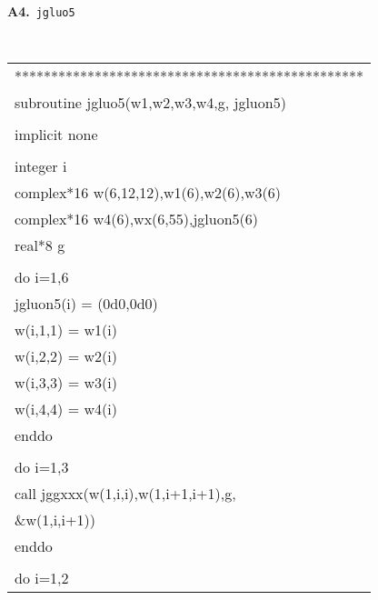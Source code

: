 \begin{center}
\clearpage
{\bf A4.}~{\tt jgluo5}\\
{\tt
\begin{supertabular}{l}
************************************************\\
     \hspace{0.5em} subroutine jgluo5(w1,w2,w3,w4,g, jgluon5) \\
\\
     \hspace{0.5em} implicit none\\
\\
     \hspace{0.5em} integer i\\
     \hspace{0.5em} complex*16 w(6,12,12),w1(6),w2(6),w3(6)\\
     \hspace{0.5em} complex*16 w4(6),wx(6,55),jgluon5(6)   \\
     \hspace{0.5em} real*8 g\\
\\
     \hspace{0.5em} do i=1,6\\
     \hspace{1em}    jgluon5(i) = (0d0,0d0)\\
     \hspace{1em}    w(i,1,1) = w1(i)\\
     \hspace{1em}    w(i,2,2) = w2(i)\\
     \hspace{1em}    w(i,3,3) = w3(i)\\
     \hspace{1em}    w(i,4,4) = w4(i)\\
     \hspace{0.5em} enddo\\
     \\
      \hspace{0.5em} do i=1,3\\
      \hspace{1em}   call jggxxx(w(1,i,i),w(1,i+1,i+1),g,\\
      \&\hspace{7em}w(1,i,i+1))\\
      \hspace{0.5em} enddo\\
\\
       \hspace{0.5em} do i=1,2 \\

\end{supertabular}}
\end{center}

